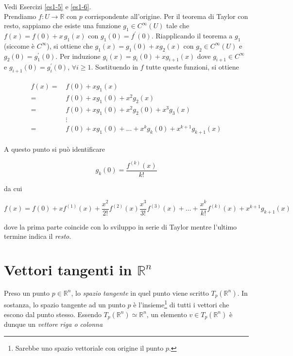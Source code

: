 Vedi Esercizi \ref{es1-5} e \ref{es1-6}.\\
Prendiamo $ f : U \to \mathbb{R} $ con $ p $ corrispondente all'origine. Per il teorema di Taylor con resto, sappiamo che esiste una funzione $ g_{1} \in C^{\infty}(U) $ tale che $ f(x) = f(0) + x \, g_{1}(x) $ con $ g_{1}(0) = f^{\prime}(0) $. Riapplicando il teorema a $ g_{1} $ (siccome è $ C^{\infty} $), si ottiene che $ g_{1}(x) = g_{1}(0) + x g_{2}(x) $ con $ g_{2} \in C^{\infty}(U) $ e $ g_{2}(0) = g_{1}^{\prime}(0) $. Per induzione $ g_{i}(x) = g_{i}(0) + x g_{i+1}(x) $ dove $ g_{i+1} \in C^{\infty} $ e $ g_{i+1}(0) = g_{i}^{\prime}(0) $, $ \forall i \geqslant 1 $. Sostituendo in $ f $ tutte queste funzioni, si ottiene

\begin{align}
	\begin{split}
			f(x) =& \, f(0) + x g_{1}(x)\\
			=& \, f(0) + x g_{1}(0) + x^{2} g_{2}(x)\\
			=& \, f(0) + x g_{1}(0) + x^{2} g_{2}(0) + x^{3} g_{3}(x)\\
			& \, \vdots\\
			=& \, f(0) + x g_{1}(0) + \dots + x^{k} g_{k}(0) + x^{k+1} g_{k+1}(x)
	\end{split}
\end{align}

A questo punto si può identificare

\begin{equation}
	g_{k}(0) = \dfrac{f^{(k)}(x)}{k!}
\end{equation}

da cui

\begin{equation}
	f(x) = f(0) + x f^{(1)}(x) + \dfrac{x^{2}}{2!} f^{(2)}(x) \dfrac{x^{3}}{3!} f^{(3)}(x) + \dots + \dfrac{x^{k}}{k!} f^{(k)}(x) + x^{k+1} g_{k+1}(x)
\end{equation}

dove la prima parte coincide con lo sviluppo in serie di Taylor mentre l'ultimo termine indica il \textit{resto}.

\section{Vettori tangenti in $ \mathbb{R}^{n} $}

Preso un punto $ p \in \mathbb{R}^{n} $, lo \textit{spazio tangente} in quel punto viene scritto $ T_{p}(\mathbb{R}^{n}) $. In sostanza, lo spazio tangente ad un punto $ p $ è l'insieme\footnote{%
	Sarebbe uno spazio vettoriale con origine il punto $ p $.%
} di tutti i vettori che escono dal punto stesso. Essendo $ T_{p}(\mathbb{R}^{n}) \simeq \mathbb{R}^{n} $, un elemento $ v \in T_{p}(\mathbb{R}^{n}) $ è dunque un \textit{vettore riga o colonna}

